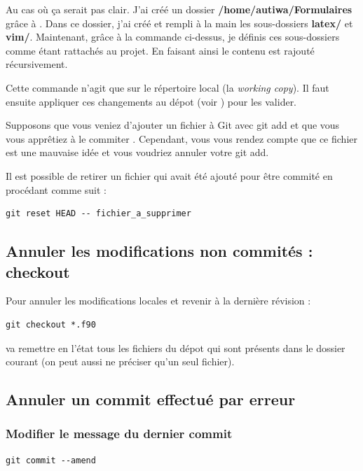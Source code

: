 \documentclass[a4paper,twoside]{article}
\begin{document}
\begin{remarque}
Au cas où ça serait pas clair. J'ai créé un dossier \textbf{/home/autiwa/Formulaires} grâce à . Dans ce dossier, j'ai créé et rempli à la main les sous-dossiers \textbf{latex/} et \textbf{vim/}. Maintenant, grâce à la commande ci-dessus, je définis ces sous-dossiers comme étant rattachés au projet. En faisant ainsi le contenu est rajouté récursivement.
\end{remarque}

\begin{attention}
Cette commande n'agit que sur le répertoire local (la \emph{working copy}). Il faut ensuite appliquer ces changements au dépot (voir ) pour les valider.
\end{attention}

\bigskip

Supposons que vous veniez d'ajouter un fichier à Git avec git add et que vous vous apprêtiez à le \og commiter \fg. Cependant, vous vous rendez compte que ce fichier est une mauvaise idée et vous voudriez annuler votre git add.

Il est possible de retirer un fichier qui avait été ajouté pour être \og commité \fg en procédant comme suit :
\begin{verbatim}
git reset HEAD -- fichier_a_supprimer
\end{verbatim}

\subsection{Annuler les modifications non commités : checkout}
Pour annuler les modifications locales et revenir à la dernière révision : 
\begin{verbatim}
git checkout *.f90
\end{verbatim}
va remettre en l'état tous les fichiers du dépot qui sont présents dans le dossier courant (on peut aussi ne préciser qu'un seul fichier).

\subsection{Annuler un commit effectué par erreur}
\subsubsection{Modifier le message du dernier commit}
\begin{verbatim}
git commit --amend
\end{verbatim}
\end{document}
